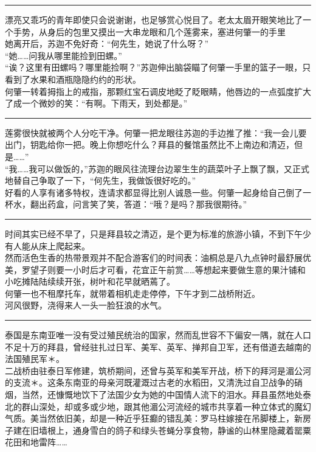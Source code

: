 \documentclass[oneside,11pt]{memoir} %
\begin{document}
\begin{CJK}{UTF8}{gbsn}
\rule{-3pt}{30pt}
    漂亮又乖巧的青年即使只会说谢谢，也足够赏心悦目了。老太太眉开眼笑地比了一个手势，从身后的包里又摸出一大串龙眼和几个莲雾来，塞进何肇一的手里\\\indent
    她离开后，苏迦不免好奇：“何先生，她说了什么呀？”\\\indent
    “她……问我从哪里能捡到田螺。”\\\indent
    “诶？这里有田螺吗？哪里能捡啊？”苏迦伸出脑袋瞄了何肇一手里的篮子一眼，只看到了水果和酒瓶隐隐约约的形状。\\\indent
    何肇一转着拇指上的戒指，那颗红宝石调皮地眨了眨眼睛，他唇边的一点弧度扩大了成一个微妙的笑：“有啊。下雨天，到处都是。”\\\indent
\rule{-3pt}{30pt}
    莲雾很快就被两个人分吃干净。何肇一把龙眼往苏迦的手边推了推：“我一会儿要出门，钥匙给你一把。晚上你想吃什么？拜县的餐馆虽然比不上南边和清迈，但是……”\\\indent
    “我……我可以做饭的，”苏迦的眼风往流理台边翠生生的蔬菜叶子上飘了飘，又正式地替自己争取了一下，“何先生，我做饭很好吃的。”\\\indent
    好看的人享有诸多特权，连请求都显得比别人诚恳一些。何肇一起身给自己倒了一杯水，翻出药盒，问言笑了笑，答道：“哦？是吗？那我很期待。”\\\indent
\rule{-3pt}{30pt}
    时间其实已经不早了，只是拜县较之清迈，是个更为标准的旅游小镇，不到下午少有人能从床上爬起来。\\\indent
    然而活色生香的热带景观并不配合游客们的时间表：油桐总是八九点钟时最舒展优美，罗望子则要一小时后才可看，花宜正午前赏……等想起来要做生意的果汁铺和小吃摊陆陆续续开张，树叶和花早就晒蔫了。\\\indent
    何肇一也不租摩托车，就带着相机走走停停，下午才到二战桥附近。\\\indent
    河风很野，浇得来人一头一脸狂浪的水气。\\\indent
\rule{-3pt}{30pt}    
    泰国是东南亚唯一没有受过殖民统治的国家，然而乱世容不下偏安一隅，就在人口不足十万的拜县，曾经驻扎过日军、美军、英军、掸邦自卫军，还有借道去越南的法国殖民军＊。\\\indent
    二战桥由驻泰日军修建，筑桥期间，还曾与英军和美军开战，桥下的拜河是湄公河的支流＊。这条东南亚的母亲河既灌溉过古老的水稻田，又清洗过自卫战争的硝烟，当然，还慷慨地饮下了法国少女为她的中国情人流下的泪水。拜县虽然地处泰北的群山深处，却或多或少地，跟其他湄公河流经的城市共享着一种立体式的魔幻气质。美当然依旧美，却是一种近乎狂癫的错乱美：罗马柱嫁接在吊脚楼上，新房子建在旧墙根上，通身雪白的鸽子和绿头苍蝇分享食物，静谧的山林里隐藏着罂粟花田和地雷阵……\\\indent

\end{CJK}
\end{document}
